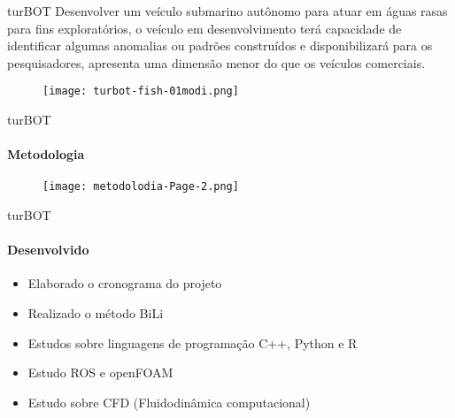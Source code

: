 \begin{frame}[c]{turBOT}
    Desenvolver um veículo submarino autônomo para atuar em águas rasas para fins exploratórios,
    o veículo em desenvolvimento terá capacidade de identificar algumas anomalias ou padrões construídos
    e disponibilizará para os pesquisadores, apresenta uma dimensão menor do que os veículos comerciais.
    \begin{figure}
        \texttt{[image: turbot-fish-01modi.png]}
    \end{figure}
    
\end{frame}
\begin{frame}[c]{turBOT }
    \framesubtitle{Metodologia}
        \begin{figure}
        \texttt{[image: metodolodia-Page-2.png]}
    \end{figure}
\end{frame}
\begin{frame}[t]{turBOT}
    \framesubtitle{Desenvolvido}
    \begin{itemize}
        \item Elaborado o cronograma do projeto
        \item Realizado o método BiLi
        \item Estudos sobre linguagens de programação C++, Python e R
        \item Estudo ROS e openFOAM
        \item Estudo sobre CFD (Fluidodinâmica computacional)
    \end{itemize}    
\end{frame}
